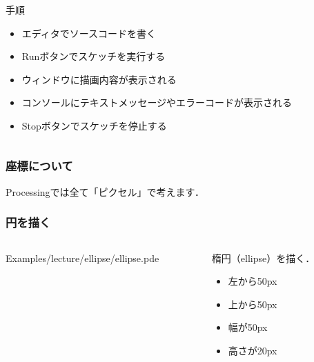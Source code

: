 \documentclass[dvipdfmx]{beamer}
\begin{document}
\begin{frame}
\begin{columns}[c]
\begin{column}{0.45\textwidth}
                    \begin{block}{手順}
                        \begin{itemize}
                            \item エディタでソースコードを書く
                            \item Runボタンでスケッチを実行する
                            \item ウィンドウに描画内容が表示される
                            \item コンソールにテキストメッセージやエラーコードが表示される
                            \item Stopボタンでスケッチを停止する
                        \end{itemize}
                    \end{block}
                \end{column}
            \end{columns}
        \end{frame}

        \begin{frame}
            \frametitle{座標について}
            \Large
            Processingでは全て「ピクセル」で考えます．
        \end{frame}

        \begin{frame}
            \frametitle{円を描く}
            \begin{columns}[c]
                \begin{column}{0.50\textwidth}
                    \tiny
                    Examples/lecture/ellipse/ellipse.pde
                    \scriptsize
                \end{column}
                \begin{column}{0.50\textwidth}
                    \begin{block}{楕円（ellipse）を描く．}
                        \begin{itemize}
                            \item 左から50px
                            \item 上から50px
                            \item 幅が50px
                            \item 高さが20px
                        \end{itemize}
                    \end{block}
                \end{column}
            \end{columns}
        \end{frame}
\end{document}
